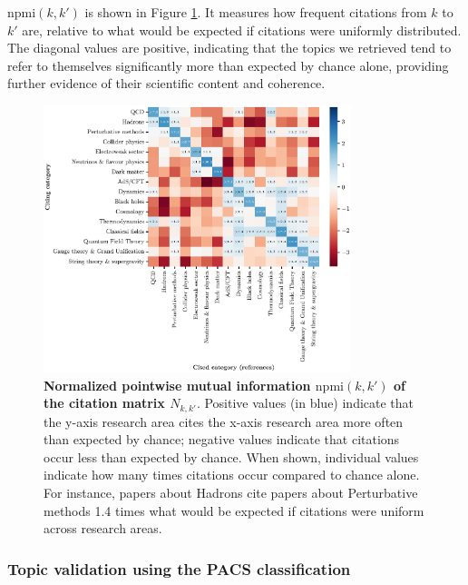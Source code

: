 \documentclass{article}
\begin{document}
$\mathrm{npmi}(k,k')$ is shown in Figure \ref{fig:topic_citation_matrix}. It measures how frequent citations from $k$ to $k'$ are, relative to what would be expected if citations were uniformly distributed. The diagonal values are positive, indicating that the topics we retrieved tend to refer to themselves significantly more than expected by chance alone, providing further evidence of their scientific content and coherence.

\begin{figure}[H]
    \centering
    \includegraphics[width=0.8\textwidth]{plots/topic_citation_matrix.eps}
    \caption{\textbf{Normalized pointwise mutual information $\mathrm{npmi}(k,k')$ of the citation matrix $N_{k,k'}$}. Positive values (in blue) indicate that the y-axis research area cites the x-axis research area more often than expected by chance; negative values indicate that citations occur less than expected by chance. When shown, individual values indicate how many times citations occur compared to chance alone. For instance, papers about Hadrons cite papers about Perturbative methods 1.4 times what would be expected if citations were uniform across research areas.}
    \label{fig:topic_citation_matrix}
\end{figure}

\subsubsection{\label{appendix:pacs_validation}Topic validation using the PACS classification}
\end{document}
